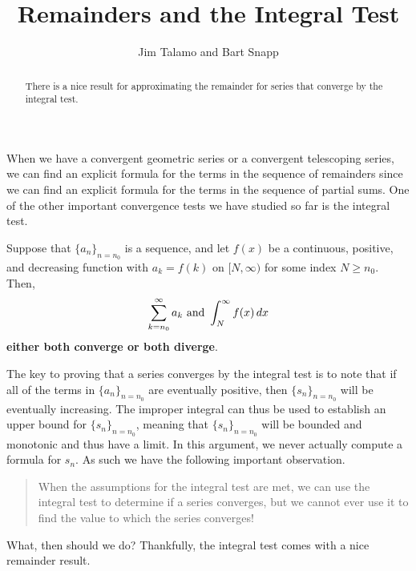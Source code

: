 \documentclass{ximera}
\title[Dig-In:]{Remainders and the Integral Test}
\author{Jim Talamo and Bart Snapp}
\begin{document}
\begin{abstract}
There is a nice result for approximating the remainder for series that converge by the integral test. 
\end{abstract}
\maketitle

When we have a convergent geometric series or a convergent telescoping series, we can find an explicit formula for the terms in the sequence of remainders since we can find an explicit formula for the terms in the sequence of partial sums.  One of the other important convergence tests we have studied so far is the integral test.

\begin{theorem}
  Suppose that $\{a_n\}_{n=n_0}$ is a sequence, and let $f(x)$ be a continuous, positive, and decreasing function
    with $a_k = f(k)$ on $[N,\infty)$ for some index $N \geq n_0$.  Then, 
    \[
    \sum_{k=n_0}^\infty a_k\text{ and }\int_N^\infty f(x) \mathop{}\!d x
    \]
    \textbf{either both converge or both diverge}.
\end{theorem}

The key to proving that a series converges by the integral test is to note that if all of the terms in $\{a_n\}_{n=n_0}$ are eventually positive, then $\{s_n\}_{n=n_0}$ will be eventually increasing.  The improper integral can thus be used to establish an upper bound for $\{s_n\}_{n=n_0}$, meaning that $\{s_n\}_{n=n_0}$ will be bounded and monotonic and thus have a limit.  In this argument, we never actually compute a formula for $s_n$.  As such we have the following important observation. 
  
\begin{quote}
When the assumptions for the integral test are met, we can use the integral test to determine if a series converges, but we cannot ever use it to find the value to which the series converges!
\end{quote}

What, then should we do?  Thankfully, the integral test comes with a nice remainder result.
\end{document}
